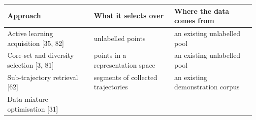 \documentclass[
  11pt,
]{article}
\begin{document}
\begin{longtable}[]{@{}lll@{}}
\toprule
\begin{minipage}[b]{0.30\columnwidth}\raggedright
Approach\strut
\end{minipage} & \begin{minipage}[b]{0.30\columnwidth}\raggedright
What it selects over\strut
\end{minipage} & \begin{minipage}[b]{0.30\columnwidth}\raggedright
Where the data comes from\strut
\end{minipage}\tabularnewline
\midrule
\endhead
\begin{minipage}[t]{0.30\columnwidth}\raggedright
Active learning acquisition {[}35, 82{]}\strut
\end{minipage} & \begin{minipage}[t]{0.30\columnwidth}\raggedright
unlabelled points\strut
\end{minipage} & \begin{minipage}[t]{0.30\columnwidth}\raggedright
an existing unlabelled pool\strut
\end{minipage}\tabularnewline
\begin{minipage}[t]{0.30\columnwidth}\raggedright
Core-set and diversity selection {[}3, 81{]}\strut
\end{minipage} & \begin{minipage}[t]{0.30\columnwidth}\raggedright
points in a representation space\strut
\end{minipage} & \begin{minipage}[t]{0.30\columnwidth}\raggedright
an existing unlabelled pool\strut
\end{minipage}\tabularnewline
\begin{minipage}[t]{0.30\columnwidth}\raggedright
Sub-trajectory retrieval {[}62{]}\strut
\end{minipage} & \begin{minipage}[t]{0.30\columnwidth}\raggedright
segments of collected trajectories\strut
\end{minipage} & \begin{minipage}[t]{0.30\columnwidth}\raggedright
an existing demonstration corpus\strut
\end{minipage}\tabularnewline
\begin{minipage}[t]{0.30\columnwidth}\raggedright
Data-mixture optimisation {[}31{]}\strut
\end{minipage} & \begin{minipage}[t]{0.30\columnwidth}\raggedright

\end{minipage}
\end{longtable}
\end{document}
